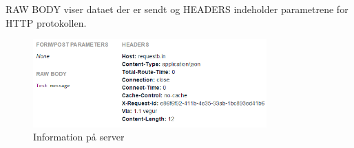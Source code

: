RAW BODY viser dataet der er sendt og HEADERS indeholder parametrene for HTTP protokollen.

\begin{figure}[H]
\centering
\includegraphics[width=0.8\textwidth]{Billeder/Test/put_request.png}
\caption{Information på server}
\label{fig:put_req}
\end{figure}
